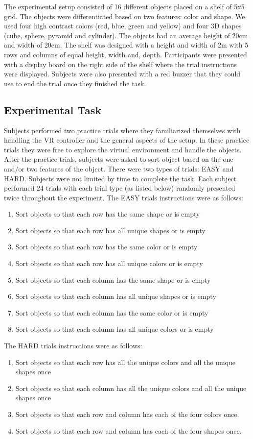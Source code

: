 The experimental setup consisted of 16 different objects placed on a shelf of 5x5 grid. The objects were differentiated based on two features: color and shape. We used four high contrast colors (red, blue, green and yellow) and four 3D shapes (cube, sphere, pyramid and cylinder). The objects had an average height of 20cm and width of 20cm. The shelf was designed with a height and width of 2m with 5 rows and columns of equal height, width and, depth. Participants were presented with a display board on the right side of the shelf where the trial instructions were displayed. Subjects were also presented with a red buzzer that they could use to end the trial once they finished the task. 



\subsection{Experimental Task}
Subjects performed two practice trials where they familiarized themselves with handling the VR controller and the general aspects of the setup. In these practice trials they were free to explore the virtual environment and handle the objects. After the practice trials, subjects were asked to sort object based on the one and/or two features of the object. There were two types of trials: EASY and HARD. Subjects were not limited by time to complete the task. Each subject performed 24 trials with each trial type (as listed below) randomly presented twice throughout the experiment. 
The EASY trials instructions were as follows:
\begin{enumerate}
    \item Sort objects so that each row has the same shape or is empty
    \item Sort objects so that each row has all unique shapes or is empty
    \item Sort objects so that each row has the same color or is empty
    \item Sort objects so that each row has all unique colors or is empty
    \item Sort objects so that each column has the same shape or is empty
    \item Sort objects so that each column has all unique shapes or is empty
    \item Sort objects so that each column has the same color or is empty
    \item Sort objects so that each column has all unique colors or is empty
\end{enumerate}
The HARD trials instructions were as follows:
\begin{enumerate}
    \item Sort objects so that each row has all the unique colors and all the unique shapes once
    \item Sort objects so that each column has all the unique colors and all the unique  shapes once
    \item Sort objects so that each row and column has each of the four colors once. 
    \item Sort objects so that each row and column has each of the four shapes once. 
\end{enumerate}


